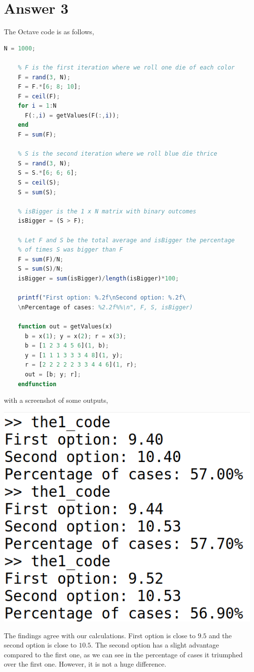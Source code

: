 \documentclass[12pt]{article}
\begin{document}
\newpage

\section*{Answer 3}

The Octave code is as follows,
\begin{lstlisting}[language=Octave]
    N = 1000;

    % F is the first iteration where we roll one die of each color
    F = rand(3, N);
    F = F.*[6; 8; 10];
    F = ceil(F);
    for i = 1:N
      F(:,i) = getValues(F(:,i));
    end
    F = sum(F);
    
    % S is the second iteration where we roll blue die thrice
    S = rand(3, N);
    S = S.*[6; 6; 6];
    S = ceil(S);
    S = sum(S);
    
    % isBigger is the 1 x N matrix with binary outcomes
    isBigger = (S > F);
    
    % Let F and S be the total average and isBigger the percentage
    % of times S was bigger than F
    F = sum(F)/N;
    S = sum(S)/N;
    isBigger = sum(isBigger)/length(isBigger)*100;
    
    printf("First option: %.2f\nSecond option: %.2f\
    \nPercentage of cases: %2.2f%%\n", F, S, isBigger)
    
    function out = getValues(x)
      b = x(1); y = x(2); r = x(3);
      b = [1 2 3 4 5 6](1, b);
      y = [1 1 1 3 3 3 4 8](1, y);
      r = [2 2 2 2 2 3 3 4 4 6](1, r);
      out = [b; y; r];
    endfunction
\end{lstlisting}

\newpage

\noindent
with a screenshot of some outputs,

\begin{center}
\includegraphics[scale = 0.5]{the1_outputs.png}
\end{center}

The findings agree with our calculations.
First option is close to $9.5$ and the second option is close to $10.5$.
The second option has a slight advantage compared to the first one, as we can
see in the percentage of cases it triumphed over the first one.
However, it is not a huge difference.
\end{document}
